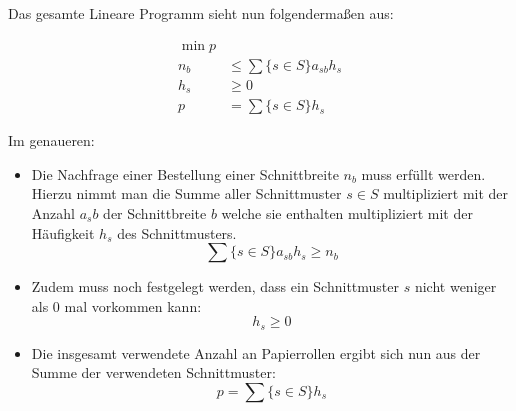 Das gesamte Lineare Programm sieht nun folgendermaßen aus:
 
\begin{align*}
\min p & \\
 n_b  & \leq \sum\{s \in S\}a_{sb} h_s\\
h_s & \geq 0 \\
p & = \sum\{s \in S\}h_s 
\end{align*}

Im genaueren:

\begin{itemize}
\item Die Nachfrage einer Bestellung einer Schnittbreite $n_b$ muss erfüllt werden. Hierzu nimmt man die Summe aller Schnittmuster $s \in S$ multipliziert mit der Anzahl $a_sb$ der Schnittbreite $b$ welche sie enthalten multipliziert mit der Häufigkeit $h_s$ des Schnittmusters.
\[ \sum\{s \in S\}a_{sb} h_s \geq n_b \] 
\item Zudem muss noch festgelegt werden, dass ein Schnittmuster $s$ nicht weniger als 0 mal vorkommen kann:
\[ h_s \geq 0 \]
\item Die insgesamt verwendete Anzahl an Papierrollen ergibt sich nun aus der Summe der verwendeten Schnittmuster:
\[ p = \sum\{s \in S\}h_s \]
\end{itemize}
 
